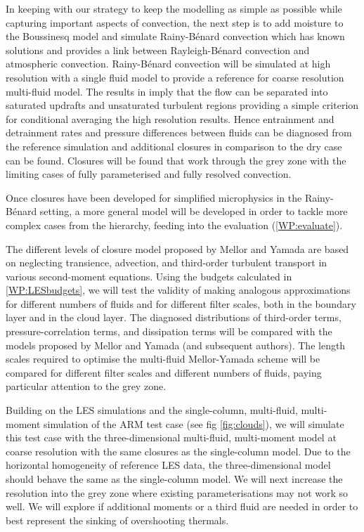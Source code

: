 \documentclass[11pt,a4paper]{article}
\begin{document}
In keeping with our strategy to keep the modelling as simple as possible while capturing important aspects of convection, the next step is to add moisture to the Boussinesq model and simulate Rainy-B\'enard convection \cite[]{WPS10,VPT19} which has known solutions and provides a link between Rayleigh-B\'enard convection and atmospheric convection. Rainy-B\'enard convection will be simulated at high resolution with a single fluid model to provide a reference for coarse resolution multi-fluid model. The results in \cite{VPT19} imply that the flow can be separated into saturated updrafts and unsaturated turbulent regions providing a simple criterion for conditional averaging the high resolution results. Hence entrainment and detrainment rates and pressure differences between fluids can be diagnosed from the reference simulation and additional closures in comparison to the dry case can be found. Closures will be found that work through the grey zone with the limiting cases of fully parameterised and fully resolved convection.

Once closures have been developed for simplified microphysics in the Rainy-B\'enard setting, a more general model will be developed in order to tackle more complex cases from the hierarchy, feeding into the evaluation (\ref{WP:evaluate}).


The different levels of closure model proposed by Mellor and Yamada are based on neglecting transience, advection, and third-order turbulent transport in various second-moment equations. Using the budgets calculated in \ref{WP:LESbudgets}, we will test the validity of making analogous approximations for different numbers of fluids and for different filter scales, both in the boundary layer and in the cloud layer. The diagnosed distributions of third-order terms, pressure-correlation terms, and dissipation terms will be compared with the models proposed by Mellor and Yamada (and subsequent authors). The length scales required to optimise the multi-fluid Mellor-Yamada scheme will be compared for different filter scales and different numbers of fluids, paying particular attention to the grey zone. 


Building on the LES simulations and the single-column, multi-fluid, multi-moment simulation of the ARM test case (see fig \ref{fig:clouds}), we will simulate this test case with the three-dimensional multi-fluid, multi-moment model at coarse resolution with the same closures as the single-column model. Due to the horizontal homogeneity of reference LES data, the three-dimensional model should behave the same as the single-column model. We will next increase the resolution into the grey zone where existing parameterisations may not work so well. We will explore if additional moments or a third fluid are needed in order to best represent the sinking of overshooting thermals. 
\end{document}
